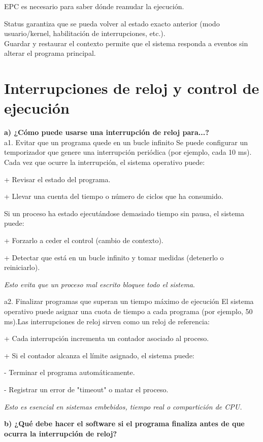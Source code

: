 \documentclass[]{article}
\begin{document}
EPC es necesario para saber dónde reanudar la ejecución.

Status garantiza que se pueda volver al estado exacto anterior (modo usuario/kernel, habilitación de interrupciones, etc.). \\

Guardar y restaurar el contexto permite que el sistema responda a eventos sin alterar el programa principal.

\section{Interrupciones de reloj y control de ejecución}

\textbf{a) ¿Cómo puede usarse una interrupción de reloj para...?} \\

 a1. Evitar que un programa quede en un bucle infinito
Se puede configurar un temporizador que genere una interrupción periódica (por ejemplo, cada 10 ms). Cada vez que ocurre la interrupción, el sistema operativo puede:

+ Revisar el estado del programa.

+ Llevar una cuenta del tiempo o número de ciclos que ha consumido.

Si un proceso ha estado ejecutándose demasiado tiempo sin pausa, el sistema puede:

+ Forzarlo a ceder el control (cambio de contexto).

+ Detectar que está en un bucle infinito y tomar medidas (detenerlo o reiniciarlo).

 \textit{Esto evita que un proceso mal escrito bloquee todo el sistema}.

 a2. Finalizar programas que superan un tiempo máximo de ejecución
El sistema operativo puede asignar una cuota de tiempo a cada programa (por ejemplo, 50 ms).Las interrupciones de reloj sirven como un reloj de referencia:

+ Cada interrupción incrementa un contador asociado al proceso.

+ Si el contador alcanza el límite asignado, el sistema puede:

- Terminar el programa automáticamente.

- Registrar un error de "timeout" o matar el proceso.

\textit{ Esto es esencial en sistemas embebidos, tiempo real o compartición de CPU.}

\textbf{b) ¿Qué debe hacer el software si el programa finaliza antes de que ocurra la interrupción de reloj?}
\end{document}
